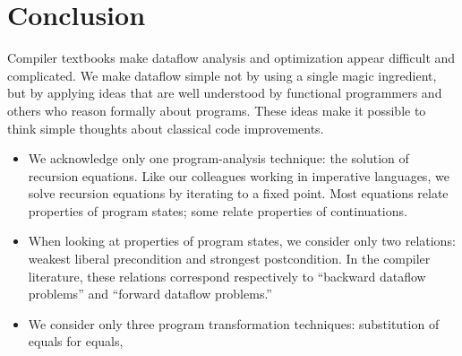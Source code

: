 \documentclass[blockstyle,preprint,nocopyrightspace]{sigplanconf}
\let\cite\citep
\newcommand{\authornote}[1]{{\em #1}}
\def\authornote#1{\unskip\relax}
\newcommand{\simon}[1]{\authornote{SLPJ: #1}}
\newcommand{\norman}[1]{\authornote{NR: #1}}
\let\remark\norman
\newcommand{\john}[1]{\authornote{JD: #1}}
\newcommand\secref[1]{Section~\ref{sec:#1}}
\begin{document}

\section{Conclusion}

Compiler textbooks make dataflow analysis and optimization appear
difficult and complicated.
We make dataflow simple not by using a single magic
ingredient, but by applying ideas that are well understood by functional
programmers and others who reason formally about programs.
These ideas
make it possible to think simple thoughts about classical code improvements.
\begin{itemize}
\item
We acknowledge only one program-analysis technique: the solution of
recursion equations.
Like our colleagues working in imperative languages, we solve
recursion equations by iterating to a fixed point.
Most equations relate
properties of program states; some relate properties of continuations.
\item
When looking at properties of program states, we consider only two
relations: weakest liberal precondition and strongest 
postcondition.
\john{Why is this tied to program states only?}
In the compiler literature, these relations correspond respectively to
``backward dataflow problems'' and ``forward dataflow problems.''
\simon{Can we give an exmple of a property of program states which is
neither, just by way of contrast; ie this we cannot do.}
\item
We consider only three program transformation techniques:
substitution of equals for equals, 

\end{itemize}
\end{document}
